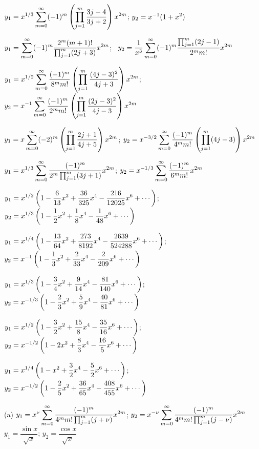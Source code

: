 $y_1=\displaystyle{x^{1/3}\sum_{m=0}^\infty(-1)^m\left(\prod_{j=1}^m
\frac{3j-4}{3j+2}\right)
x^{2m}}$;    $y_2=\displaystyle{x^{-1}(1+x^2)}$

$y_1=\displaystyle{\sum_{m=0}^\infty(-1)^m\frac{2^m(m+1)!}{\prod_{j=1}^m(2j+3)}x^{2m}}$; \,
$y_2=\displaystyle{\frac{1}{x^3}\sum_{m=0}^\infty(-1)^m\frac{\prod_{j=1}^m(2j-1)}{2^mm!}x^{2m}}$

$y_1=\displaystyle{x^{1/2}\sum_{m=0}^\infty\frac{(-1)^m}{8^mm!}\left(\prod_{j=1}^m
\frac{(4j-3)^2}{4j+3}\right)x^{2m}}$;
$y_2=\displaystyle{x^{-1}\sum_{m=0}^\infty\frac{(-1)^m}{2^mm!}\left(\prod_{j=1}^m
\frac{(2j-3)^2}{4j-3}\right)
x^{2m}}$

$y_1=\displaystyle{x\sum_{m=0}^\infty(-2)^m\left(\prod_{j=1}^m\frac{2j+1}{4j+5}\right) x^{2m}}$;
$y_2=\displaystyle{x^{-3/2}\sum_{m=0}^\infty\frac{(-1)^m}{4^mm!}\left(\prod_{j=1}^m(4j-3)
\right)x^{2m}}$

$y_1=\displaystyle{x^{1/3}\sum_{m=0}^\infty\frac{(-1)^m}{2^m\prod_{j=1}^m(3j+1)}
x^{2m}}$;
$y_2=\displaystyle{x^{-1/3}\sum_{m=0}^\infty\frac{(-1)^m}{6^mm!} x^{2m}}$

$y_1=\displaystyle{x^{1/2}\left(1-\frac{6}{13}x^2+\frac{36}{325}x^4-
\frac{216}{12025}x^6
+\cdots\right)}$;    \,
$y_2=\displaystyle{x^{1/3}\left(1-\frac{1}{2}x^2+\frac{1}{8}x^4-\frac{1}{48}x^6
+\cdots\right)}$

$y_1=\displaystyle{x^{1/4}\left(1-\frac{13}{64}x^2+\frac{273}{8192}x^4-
\frac{2639}{524288}x^6 +\cdots\right)}$; \,
$y_2=\displaystyle{x^{-1}\left(1-\frac{1}{3}x^2+\frac{2}{33}x^4-\frac{2}{209}x^6
+\cdots\right)}$

$y_1=\displaystyle{x^{1/3}\left(1-\frac{3}{4}x^2+\frac{9}{14}x^4-\frac{81}{140}x^6
+\cdots\right)}$; \,
$y_2=\displaystyle{x^{-1/3}\left(1-\frac{2}{3}x^2+\frac{5}{9}x^4-
\frac{40}{81}x^6+\cdots\right)}$

$y_1=\displaystyle{x^{1/2}\left(1-\frac{3}{2}x^2+\frac{15}{8}x^4-\frac{35}{16}x^6
+\cdots\right)}$; \,
$y_2=\displaystyle{x^{-1/2}\left(1-2x^2+\frac{8}{3}x^4-\frac{16}{5}x^6
+\cdots\right)}$

$y_1=\displaystyle{x^{1/4}\left(1-x^2+\frac{3}{2}x^4-\frac{5}{2}x^6
+\cdots\right)}$; \,
$y_2=\displaystyle{x^{-1/2}\left(1-\frac{2}{5}x^2+\frac{36}{65}x^4-
\frac{408}{455}x^6+\cdots\right)}$

(a)
$y_1=\displaystyle{x^\nu\sum_{m=0}^\infty\frac{(-1)^m}{4^mm!\prod_{j=1}^m(j+\nu)}x^{2m}}$;
$y_2=\displaystyle{x^{-\nu}\sum_{m=0}^\infty\frac{(-1)^m}{4^mm!\prod_{j=1}^m(j-\nu)}x^{2m}}$
$y_1=\dfrac{\sin x}{\sqrt x}$;   $y_2=\dfrac{\cos x}{\sqrt x}$

